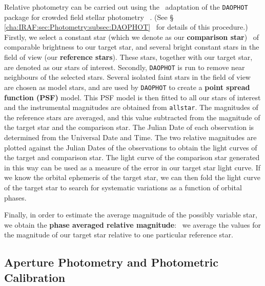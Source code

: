 Relative photometry can be carried out using the \iraf\ adaptation of the \texttt{DAOPHOT} package for crowded field stellar photometry%
\ \cite{Stetson:1987}. %
(See \S~%
\vref{cha:IRAF:sec:Photometry:subsec:DAOPHOT}%
\ for details of this procedure.) %
Firstly, we select a constant star (which we denote as our \textbf{comparison star})%
\label{cha:InfraredDataReductionTechniques:sec:Photometry:subsec:RelativePhotometry:topic:comparison}%
\ of comparable brightness to our target star, and several bright constant stars in the field of view (our \textbf{reference stars}). These stars, together with our target star, are denoted as our stars of
interest. Secondly, \texttt{DAOPHOT} is run to remove near neighbours of the selected
stars. Several isolated faint stars in the field of view are chosen
as model stars, and are used by \texttt{DAOPHOT} to create a
\textbf{point spread function (PSF)} model.
This PSF model is then fitted to all our stars of interest and the instrumental magnitudes are obtained from \texttt{allstar}. The magnitudes of the reference stars are averaged, and this value
subtracted from the magnitude of the target star and the comparison star.  The
Julian Date of each observation is determined from the Universal Date
and Time. The two relative magnitudes are plotted against the Julian Dates of
the observations to obtain the light curves of the target and
comparison star. The light curve of the comparison star generated in this way can be used as a measure of the error in our target star light curve. If we know the orbital ephemeris of the target star, we can then fold the light curve of the target star to search for systematic variations as a function of orbital phases. %

\vspace{\myparskip}

Finally, in order to estimate the average magnitude of the possibly
variable star, we obtain the \textbf{phase averaged relative
magnitude}:%
\label{cha:InfraredDataReductionTechniques:sec:Photometry:subsec:RelativePhotometry:topic:parm}%
\ we average the values for the magnitude of our target star
relative to one particular reference star.


\subsection{Aperture Photometry and Photometric Calibration}
\label{cha:InfraredDataReductionTechniques:sec:Photometry:subsec:AperturePhotometry}

